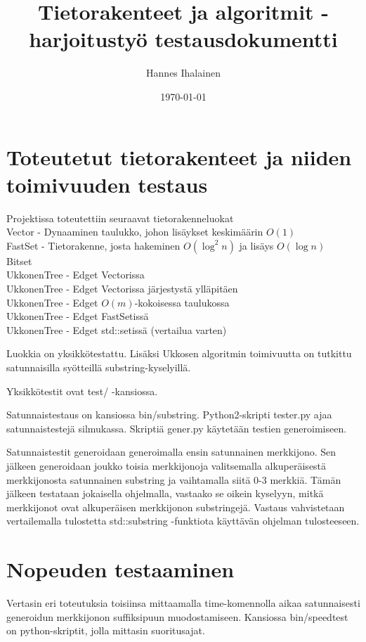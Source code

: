 \documentclass{article}
\title{Tietorakenteet ja algoritmit -harjoitustyö testausdokumentti}
\author{Hannes Ihalainen}
\date{\today}
\begin{document}
    \maketitle
    \newpage
    \tableofcontents
    \newpage
    \section{Toteutetut tietorakenteet ja niiden toimivuuden testaus}
        Projektissa toteutettiin seuraavat tietorakenneluokat \\
        Vector - Dynaaminen taulukko, johon lisäykset keskimäärin $O(1)$\\
        FastSet - Tietorakenne, josta hakeminen $O(\log^2 n)$ ja lisäys $O(\log n)$\\
        Bitset \\
        UkkonenTree - Edget Vectorissa \\
        UkkonenTree - Edget Vectorissa järjestystä ylläpitäen \\
        UkkonenTree - Edget $O(m)$-kokoisessa taulukossa \\
        UkkonenTree - Edget FastSetissä \\
        UkkonenTree - Edget std::setissä (vertailua varten) 

        Luokkia on yksikkötestattu. Lisäksi Ukkosen algoritmin toimivuutta on tutkittu satunnaisilla syötteillä
        substring-kyselyillä.

        Yksikkötestit ovat test/ -kansiossa.

        Satunnaistestaus on kansiossa bin/substring. Python2-skripti tester.py ajaa satunnaistestejä silmukassa. 
        Skriptiä gener.py käytetään testien generoimiseen.

        Satunnaistestit generoidaan generoimalla ensin satunnainen merkkijono. Sen jälkeen generoidaan joukko toisia 
        merkkijonoja valitsemalla alkuperäisestä merkkijonosta satunnainen substring ja vaihtamalla siitä 0-3 merkkiä. 
        Tämän jälkeen testataan jokaisella ohjelmalla, vastaako se oikein kyselyyn, mitkä merkkijonot ovat alkuperäisen
        merkkijonon substringejä. Vastaus vahvistetaan vertailemalla tulostetta std::substring -funktiota käyttävän 
        ohjelman tulosteeseen.

    \section{Nopeuden testaaminen}

        Vertasin eri toteutuksia toisiinsa mittaamalla time-komennolla aikaa satunnaisesti generoidun merkkijonon suffiksipuun muodostamiseen. Kansiossa bin/speedtest on python-skriptit, jolla mittasin suoritusajat.
\end{document}
